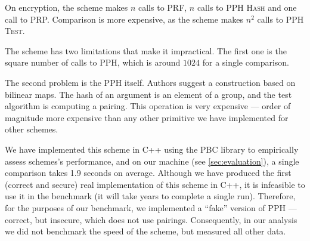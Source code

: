 		On encryption, the scheme makes $n$ calls to PRF, $n$ calls to PPH \textsc{Hash} and one call to PRP\@.
		Comparison is more expensive, as the scheme makes $n^2$ calls to PPH \textsc{Test}.

		The scheme has two limitations that make it impractical.
		The first one is the square number of calls to PPH, which is around $1024$ for a single comparison.

		The second problem is the PPH itself.
		Authors suggest a construction based on bilinear maps.
		The hash of an argument is an element of a group, and the test algorithm is computing a pairing.
		This operation is very expensive --- order of magnitude more expensive than any other primitive we have implemented for other schemes.

		We have implemented this scheme in C++ using the PBC library \cite{pbc} to empirically assess schemes's performance, and on our machine (see \cref{sec:evaluation}), a single comparison takes 1.9 seconds on average.
		Although we have produced the first (correct and secure) real implementation of this scheme in C++, it is infeasible to use it in the benchmark (it will take years to complete a single run).
		Therefore, for the purposes of our benchmark, we implemented a ``fake'' version of PPH --- correct, but insecure, which does not use pairings.
		Consequently, in our analysis we did not benchmark the speed of the scheme, but measured all other data.

